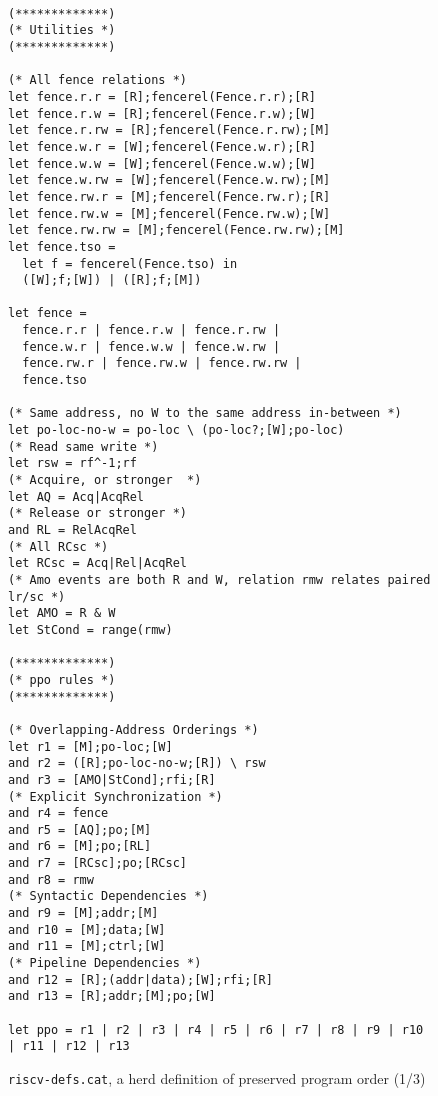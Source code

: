 \begin{figure}[h!]
  {
  \tt\bfseries\centering\footnotesize
  \begin{lstlisting}
(*************)
(* Utilities *)
(*************)

(* All fence relations *)
let fence.r.r = [R];fencerel(Fence.r.r);[R]
let fence.r.w = [R];fencerel(Fence.r.w);[W]
let fence.r.rw = [R];fencerel(Fence.r.rw);[M]
let fence.w.r = [W];fencerel(Fence.w.r);[R]
let fence.w.w = [W];fencerel(Fence.w.w);[W]
let fence.w.rw = [W];fencerel(Fence.w.rw);[M]
let fence.rw.r = [M];fencerel(Fence.rw.r);[R]
let fence.rw.w = [M];fencerel(Fence.rw.w);[W]
let fence.rw.rw = [M];fencerel(Fence.rw.rw);[M]
let fence.tso =
  let f = fencerel(Fence.tso) in
  ([W];f;[W]) | ([R];f;[M])

let fence = 
  fence.r.r | fence.r.w | fence.r.rw |
  fence.w.r | fence.w.w | fence.w.rw |
  fence.rw.r | fence.rw.w | fence.rw.rw |
  fence.tso

(* Same address, no W to the same address in-between *)
let po-loc-no-w = po-loc \ (po-loc?;[W];po-loc)
(* Read same write *)
let rsw = rf^-1;rf
(* Acquire, or stronger  *)
let AQ = Acq|AcqRel
(* Release or stronger *)
and RL = RelAcqRel
(* All RCsc *)
let RCsc = Acq|Rel|AcqRel
(* Amo events are both R and W, relation rmw relates paired lr/sc *)
let AMO = R & W
let StCond = range(rmw)

(*************)
(* ppo rules *)
(*************)

(* Overlapping-Address Orderings *)
let r1 = [M];po-loc;[W]
and r2 = ([R];po-loc-no-w;[R]) \ rsw
and r3 = [AMO|StCond];rfi;[R]
(* Explicit Synchronization *)
and r4 = fence
and r5 = [AQ];po;[M]
and r6 = [M];po;[RL]
and r7 = [RCsc];po;[RCsc]
and r8 = rmw
(* Syntactic Dependencies *)
and r9 = [M];addr;[M]
and r10 = [M];data;[W]
and r11 = [M];ctrl;[W]
(* Pipeline Dependencies *)
and r12 = [R];(addr|data);[W];rfi;[R]
and r13 = [R];addr;[M];po;[W]

let ppo = r1 | r2 | r3 | r4 | r5 | r6 | r7 | r8 | r9 | r10 | r11 | r12 | r13
\end{lstlisting}
  }
  \caption{{\tt riscv-defs.cat}, a herd definition of preserved program order (1/3)}
  \label{fig:herd1}
\end{figure}

